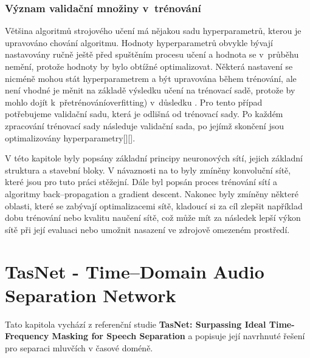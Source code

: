 \subsection{Význam validační množiny v~trénování}
Většina algoritmů strojového učení má nějakou sadu hyperparametrů, kterou je upravováno chování algoritmu. Hodnoty hyperparametrů obvykle bývají nastavovány ručně ještě před spuštěním procesu učení a hodnota se v~průběhu nemění, protože hodnoty by bylo obtížné optimalizovat. 
Některá nastavení se nicméně mohou stát hyperparametrem a být upravována během trénování, ale není vhodné je měnit na základě výsledku učení na trénovací sadě, protože by mohlo dojít k~přetrénováníoverfitting) v~důsledku . Pro tento případ potřebujeme validační sadu, která je odlišná od trénovací sady.
Po každém zpracování trénovací sady následuje validační sada, po jejímž skončení jsou optimalizovány hyperparametry[][].




\bigskip
V této kapitole byly popsány základní principy neuronových sítí, jejich základní struktura a stavební bloky. V návaznosti na to byly zmíněny konvoluční sítě, které jsou pro tuto práci stěžejní. Dále byl popsán proces trénování sítí a algoritmy back--propagation a gradient descent. Nakonec byly zmíněny některé oblasti, které se zabývají optimalizacemi sítě, kladoucí si za cíl zlepšit například dobu trénování nebo kvalitu naučení sítě, což může mít za následek lepší výkon sítě při její evaluaci nebo umožnit nasazení ve zdrojově omezeném prostředí.



\chapter{TasNet - Time--Domain Audio Separation Network}
\label{tasnet}

Tato kapitola vychází z referenční studie \textbf{TasNet: Surpassing Ideal Time-Frequency Masking for Speech Separation}\cite{luo2018convtasnet} a popisuje její navrhnuté řešení pro separaci mluvčích v časové doméně.

